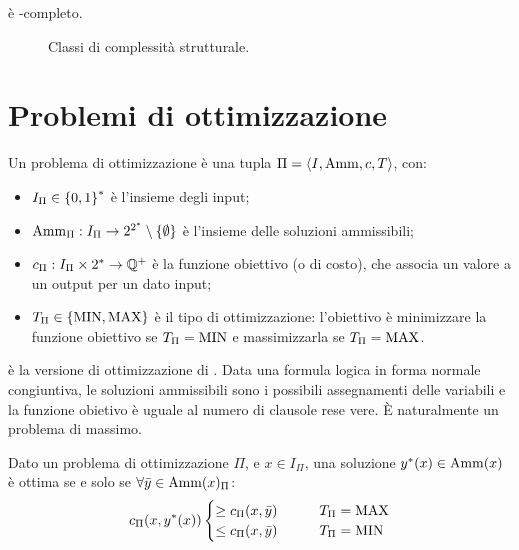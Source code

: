 \begin{theorem}
	\Sat è \NP-completo.
\end{theorem}

\begin{figure}
	\centering
	
	\caption{Classi di complessità strutturale.}
	\label{fig:structcomplclass}
\end{figure}



\section{Problemi di ottimizzazione}

\begin{defin}
	Un problema di ottimizzazione è una tupla $\Pi=\langle I,\mathrm{Amm},c,T \rangle$, con:
	\begin{itemize}
		\item $I_\Pi\in\left\{ 0,1 \right\}^*$ è l'insieme degli input;
		\item $\mathrm{Amm}_\Pi: I_\Pi\to2^{2^*}\setminus\left\{ \emptyset \right\}$ è l'insieme delle soluzioni ammissibili;
		\item $c_\Pi:I_\Pi\times 2^*\to\mathbb Q^+$ è la funzione obiettivo (o di costo), che associa un valore a un output per un dato input;
		\item $T_\Pi \in\left\{ \mathrm{MIN},\mathrm{MAX} \right\}$ è il tipo di ottimizzazione: l'obiettivo è minimizzare la funzione obiettivo se $T_\Pi=\mathrm{MIN}$ e massimizzarla se $T_\Pi=\mathrm{MAX}$.
	\end{itemize}
\end{defin}

\begin{examp}
	\MaxSat è la versione di ottimizzazione di \Sat. Data una formula logica in forma normale congiuntiva, le soluzioni ammissibili sono i possibili assegnamenti delle variabili e la funzione obietivo è uguale al numero di clausole rese vere. È naturalmente un problema di massimo.
\end{examp}

\begin{defin}
	Dato un problema di ottimizzazione $\Pi$, e $x\in I_\Pi$, una soluzione $y^*(x)\in\mathrm{Amm}(x)$ è ottima se e solo se $\forall \bar y\in\mathrm{Amm}(x)_\Pi$:
	\begin{equation*}
		c_\Pi(x,y^*(x))
		\begin{cases}
			\geq c_\Pi(x,\bar y) \qquad & T_\Pi=\mathrm{MAX} \\
			\leq c_\Pi(x,\bar y) \qquad & T_\Pi=\mathrm{MIN}
		\end{cases}
	\end{equation*}
\end{defin}


